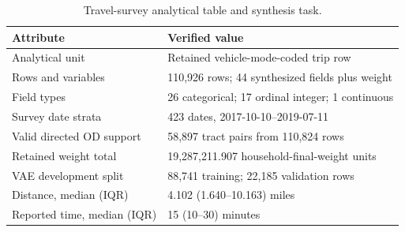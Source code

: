 \begin{table}[!htbp]
\caption{Travel-survey analytical table and synthesis task.}
\label{tab:surveydata}
\centering
\begin{tabularx}{\textwidth}{P{0.32\textwidth}Y}
\toprule
\textbf{Attribute} & \textbf{Verified value} \\
\midrule
Analytical unit & Retained vehicle-mode-coded trip row \\
Rows and variables & 110,926 rows; 44 synthesized fields plus weight \\
Field types & 26 categorical; 17 ordinal integer; 1 continuous \\
Survey date strata & 423 dates, 2017-10-10--2019-07-11 \\
Valid directed OD support & 58,897 tract pairs from 110,824 rows \\
Retained weight total & 19,287,211.907 household-final-weight units \\
VAE development split & 88,741 training; 22,185 validation rows \\
Distance, median (IQR) & 4.102 (1.640--10.163) miles \\
Reported time, median (IQR) & 15 (10--30) minutes \\
\bottomrule
\end{tabularx}
\end{table}
